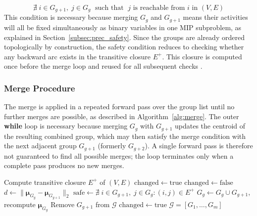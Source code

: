 \begin{equation}
    \nexists\; i \in G_{g+1},\; j \in G_g
    \;\text{ such that }\;
    j \text{ is reachable from } i \text{ in } (V, E)
    \label{eq:merge_safety}
\end{equation}
This condition is necessary because merging $G_g$ and
$G_{g+1}$ means their activities will all be fixed
simultaneously as binary variables in one MIP subproblem, as
explained in Section~\ref{subsec:prec_safety}.
Since the groups are already ordered topologically by
construction, the safety condition reduces to checking
whether any backward arc exists in the transitive closure
$E^+$. This closure is computed once before the merge loop
and reused for all subsequent checks
\parencite{Demeulemeester2002}.

\subsubsection{Merge Procedure}
\label{subsubsec:merge_procedure}

The merge is applied in a repeated forward pass over the
group list until no further merges are possible, as
described in Algorithm~\ref{alg:merge}. The outer
\textbf{while} loop is necessary because merging $G_g$
with $G_{g+1}$ updates the centroid of the resulting
combined group, which may then satisfy the merge condition
with the next adjacent group $G_{g+1}$ (formerly $G_{g+2}$).
A single forward pass is therefore not guaranteed to find
all possible merges; the loop terminates only when a
complete pass produces no new merges.

\begin{algorithm}[ht]
\caption{Adjacent group merge post-processing}
\label{alg:merge}
\begin{algorithmic}[1]
\State Compute transitive closure $E^+$ of $(V, E)$
\State $\mathrm{changed} \leftarrow \mathrm{true}$
    \State $\mathrm{changed} \leftarrow \mathrm{false}$
        \State $d \leftarrow
               \|\boldsymbol{\mu}_{G_g} -
                 \boldsymbol{\mu}_{G_{g+1}}\|_2$
        \State $\mathrm{safe} \leftarrow
               \nexists\; i \!\in\! G_{g+1},\;
               j \!\in\! G_g : (i,j) \in E^+$
            \State $G_g \leftarrow G_g \cup G_{g+1}$,\;
                   recompute $\boldsymbol{\mu}_{G_g}$
            \State Remove $G_{g+1}$ from $\mathcal{G}$
            \State $\mathrm{changed} \leftarrow \mathrm{true}$
        \EndIf
    \EndFor
\EndWhile
\State \Return $\mathcal{G} = [G_1, \ldots, G_m]$
\end{algorithmic}
\end{algorithm}

